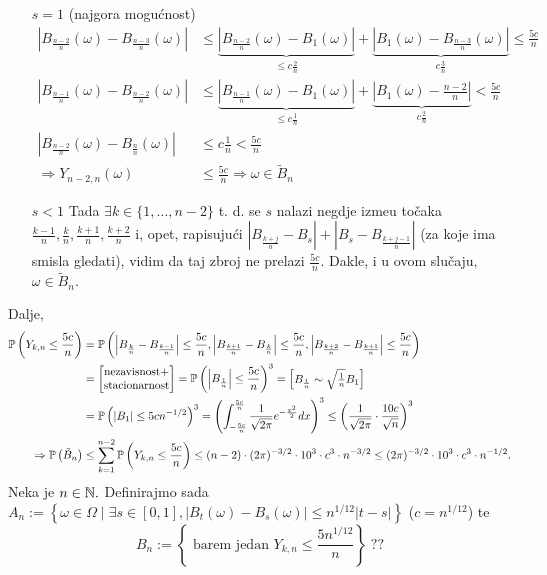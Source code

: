 \documentclass{article}
\begin{document}
\begin{enumerate}
    \item[\(s=1\)] (najgora mogućnost) \[\begin{aligned}\left|B_{\frac{n-2}n}(\omega)-B_{\frac{n-3}n}(\omega)\right|&\le\underbrace{\left|B_{\frac{n-2}n}(\omega)-B_1(\omega)\right|}_{\le c\frac2n}+\underbrace{\left|B_1(\omega)-B_{\frac{n-3}n}(\omega)\right|}_{c\frac3n}\le\frac{5c}n\\\left|B_{\frac{n-1}n}(\omega)-B_{\frac{n-2}n}(\omega)\right|&\le\underbrace{\left|B_{\frac{n-1}n}(\omega)-B_1(\omega)\right|}_{\le c\frac1n}+\underbrace{\left|B_1(\omega)-{\frac{n-2}n}\right|}_{c\frac2n}<\frac{5c}n\\\left|B_{\frac{n-2}n}(\omega)-B_{\frac{n}n}(\omega)\right|&\le c\frac1n<\frac{5c}n\\\Rightarrow Y_{n-2,n}(\omega)&\le\frac{5c}n\Rightarrow\omega\in\tilde B_n\end{aligned}\] 
    \item[\(s<1\)] Tada \(\exists k\in\{1,\ldots,n-2\}\) t. d. se \(s\) nalazi negdje izme\dj{}u točaka \(\frac{k-1}n,\frac{k}n,\frac{k+1}n,\frac{k+2}n\) i, opet, rapisujući \(\left|B_{\frac{k+j}n}-B_s\right|+\left|B_s-B_{\frac{k+j-1}n}\right|\) (za koje ima smisla gledati), vidim da taj zbroj ne prelazi \(\frac{5c}n.\) Dakle, i u ovom slučaju, \(\omega\in\tilde B_n.\)  
\end{enumerate}
Dalje, \[\begin{aligned}\Bbb P\left(Y_{k,n}\le\frac{5c}n\right)&=\Bbb P\left(\left|B_{\frac{k}n}-B_{\frac{k-1}n}\right|\le\frac{5c}n,\left|B_{\frac{k+1}n}-B_{\frac{k}n}\right|\le\frac{5c}n,\left|B_{\frac{k+2}n}-B_{\frac{k+1}n}\right|\le\frac{5c}n\right)\\&=\begin{bmatrix}\text{nezavisnost}+\\\text{stacionarnost}\end{bmatrix}=\Bbb P\left(\left|B_{\frac1n}\right|\le\frac{5c}n\right)^3=\begin{bmatrix}B_{\frac1n}\sim\sqrt{\frac1n}B_1\end{bmatrix}\\&=\Bbb P\left(|B_1|\le 5cn^{-1/2}\right)^3=\left(\int_{-\frac{5c}n}^{\frac{5c}n}\frac1{\sqrt{2\pi}}e^{-\frac{x^2}2}dx\right)^3\le\left(\frac1{\sqrt{2\pi}}\cdot\frac{10c}{\sqrt n}\right)^3\\\Rightarrow\Bbb P\left(\tilde B_n\right)&\le\sum_{k=1}^{n-2}\Bbb P\left(Y_{k,n}\le\frac{5c}n\right)\le (n-2)\cdot(2\pi)^{-3/2}\cdot 10^3\cdot c^3\cdot n^{-3/2}\le(2\pi)^{-3/2}\cdot10^3\cdot c^3\cdot n^{-1/2}.\end{aligned}\] Neka je \(n\in\Bbb N.\) Definirajmo sada \(A_n:=\left\{\omega\in\Omega\mid\exists s\in[0,1],|B_t(\omega)-B_s(\omega)|\le n^{1/12}|t-s|\right\}\) (\(c=n^{1/12}\)) te \[B_n:=\left\{\text{ barem jedan }Y_{k,n}\le\frac{5n^{1/12}}n\right\}\;??\]
\end{document}
